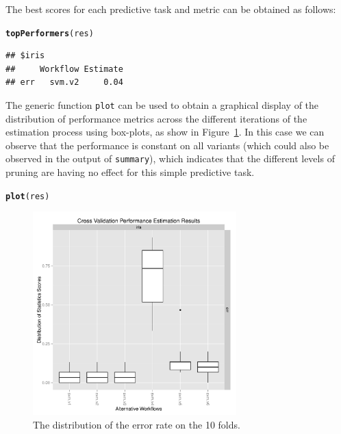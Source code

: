 \documentclass[10pt,a4paper]{article}\usepackage[]{graphicx}\usepackage[]{color}
\makeatletter
\newcommand{\hlstd}[1]{\textcolor[rgb]{0.345,0.345,0.345}{#1}}%
\newcommand{\hlkwd}[1]{\textcolor[rgb]{0.737,0.353,0.396}{\textbf{#1}}}%
\newenvironment{kframe}{%
 \def\at@end@of@kframe{}%
 \ifinner\ifhmode%
  \def\at@end@of@kframe{\end{minipage}}%
  \begin{minipage}{\columnwidth}%
 \fi\fi%
 \def\FrameCommand##1{\hskip\@totalleftmargin \hskip-\fboxsep
 \colorbox{shadecolor}{##1}\hskip-\fboxsep
     \hskip-\linewidth \hskip-\@totalleftmargin \hskip\columnwidth}%
 \MakeFramed {\advance\hsize-\width
   \@totalleftmargin\z@ \linewidth\hsize
   \@setminipage}}%
 {\par\unskip\endMakeFramed%
 \at@end@of@kframe}
\newenvironment{knitrout}{}{} %
\makeatother
\begin{document}
The best scores for each predictive task and metric can be obtained as follows:

\begin{knitrout}
\color{fgcolor}\begin{kframe}
\begin{alltt}
\hlkwd{topPerformers}\hlstd{(res)}
\end{alltt}
\begin{verbatim}
## $iris
##     Workflow Estimate
## err   svm.v2     0.04
\end{verbatim}
\end{kframe}
\end{knitrout}


The generic function \texttt{plot} can be used to obtain a graphical
display of the distribution of performance metrics across the
different iterations of the estimation process using box-plots, as
show in Figure~\ref{fig:ex1Iris}. In this case we can observe that the
performance is constant on all variants (which could also be observed
in the output of \texttt{summary}), which indicates that the different
levels of pruning are having no effect for this simple predictive
task.

\begin{knitrout}
\color{fgcolor}\begin{kframe}
\begin{alltt}
\hlkwd{plot}\hlstd{(res)}
\end{alltt}
\end{kframe}\begin{figure}[]


{\centering \includegraphics[width=0.7\textwidth]{figures/perfEst-ex1Iris} 

}

\caption[The distribution of the error rate on the 10 folds]{The distribution of the error rate on the 10 folds.\label{fig:ex1Iris}}
\end{figure}


\end{knitrout}
\end{document}
